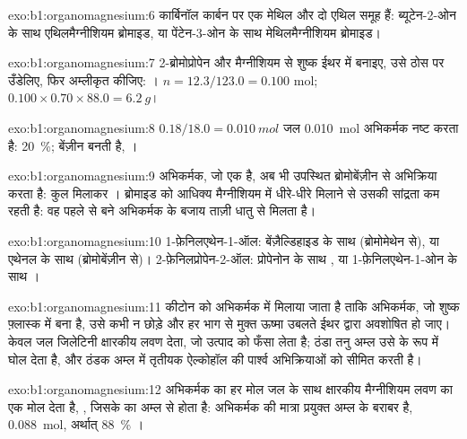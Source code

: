 \begin{solution}{exo:b1:organomagnesium:6}
कार्बिनॉल कार्बन पर एक मेथिल और दो एथिल समूह हैं:
ब्यूटेन-2-ओन के साथ एथिलमैग्नीशियम ब्रोमाइड, या पेंटेन-3-ओन के साथ
मेथिलमैग्नीशियम ब्रोमाइड।
\end{solution}

\begin{solution}{exo:b1:organomagnesium:7}
2-ब्रोमोप्रोपेन और मैग्नीशियम से शुष्क ईथर में  बनाइए,
उसे ठोस  पर उँडेलिए, फिर अम्लीकृत कीजिए: । $n = 12.3/123.0 = 0.100$ mol;
$0.100 \times 0.70 \times 88.0 = \qty{6.2}{g}$।
\end{solution}

\begin{solution}{exo:b1:organomagnesium:8}
$0.18/18.0 = \qty{0.010}{mol}$ जल \qty{0.010}{mol}
अभिकर्मक नष्ट करता है: \qty{20}{\percent}; बेंज़ीन बनती है, ।
\end{solution}

\begin{solution}{exo:b1:organomagnesium:9}
अभिकर्मक, जो एक  है, अब भी उपस्थित ब्रोमोबेंज़ीन से अभिक्रिया करता है:
कुल मिलाकर । ब्रोमाइड को
आधिक्य मैग्नीशियम में धीरे-धीरे मिलाने से उसकी सांद्रता कम रहती है: वह पहले से बने
अभिकर्मक के बजाय ताज़ी धातु से मिलता है।
\end{solution}

\begin{solution}{exo:b1:organomagnesium:10}
1-फ़ेनिलएथेन-1-ऑल: बेंज़ैल्डिहाइड के साथ  (ब्रोमोमेथेन से),
या एथेनल के साथ  (ब्रोमोबेंज़ीन से)। 2-फ़ेनिलप्रोपेन-2-ऑल:
प्रोपेनोन के साथ , या
1-फ़ेनिलएथेन-1-ओन के साथ ।
\end{solution}

\begin{solution}{exo:b1:organomagnesium:11}
कीटोन को अभिकर्मक में मिलाया जाता है ताकि अभिकर्मक, जो शुष्क
फ़्लास्क में बना है, उसे कभी न छोड़े और हर भाग से मुक्त ऊष्मा
उबलते ईथर द्वारा अवशोषित हो जाए। केवल जल जिलेटिनी
क्षारकीय लवण  देता, जो उत्पाद को फँसा लेता है; ठंडा तनु अम्ल
उसे  के रूप में घोल देता है, और ठंडक अम्ल में तृतीयक ऐल्कोहॉल की
पार्श्व अभिक्रियाओं को सीमित करती है।
\end{solution}

\begin{solution}{exo:b1:organomagnesium:12}
अभिकर्मक का हर मोल जल के साथ क्षारकीय मैग्नीशियम लवण का एक मोल देता है,
, जिसके  का अम्ल से  होता है:
अभिकर्मक की मात्रा प्रयुक्त अम्ल के बराबर है, \qty{0.088}{mol}, अर्थात्
\qty{88}{\percent} ।
\end{solution}

